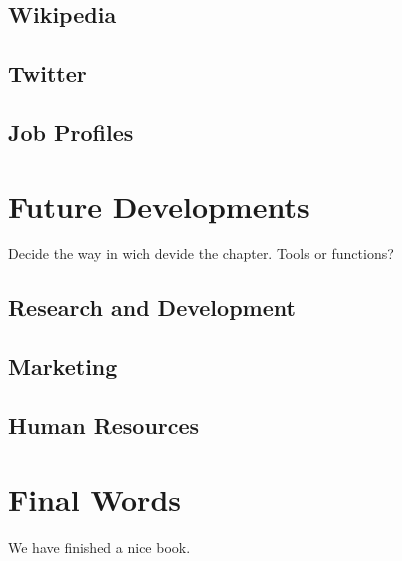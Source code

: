 \documentclass[]{book}
\begin{document}
\section{Wikipedia}\label{wikipedia-2}

\section{Twitter}\label{twitter-2}

\section{Job Profiles}\label{job-profiles-2}

\chapter{Future Developments}\label{future-developments}

Decide the way in wich devide the chapter. Tools or functions?

\section{Research and Development}\label{research-and-development}

\section{Marketing}\label{marketing}

\section{Human Resources}\label{human-resources}

\chapter{Final Words}\label{final-words}

We have finished a nice book.


\end{document}
